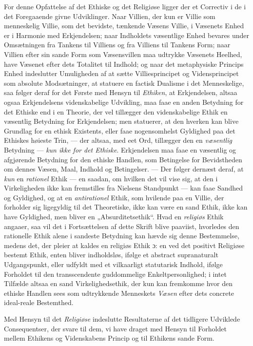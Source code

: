 \documentclass[12pt,a4paper]{book}
\newcommand{\opage}[1]{\marginnote{\footnotesize\textit{[#1]}}}
\begin{document}
\opage{163}For denne Opfattelse af det Ethiske og det Religiøse ligger der et Correctiv i de i det
Foregaaende givne Udviklinger. Naar Villien, der kun er Villie som menneskelig Villie, som
det bevidste, tænkende Væsens Villie, i Væsenets Enhed er i Harmonie med Erkjendelsen; naar
Indholdets væsentlige Enhed bevares under Omsætningen fra Tankens til Villiens og fra
Villiens til Tankens Form; naar Villien efter sin sande Form som Væsensvillen maa udtrykke
Væsenets Heelhed, have Væsenet efter dets Totalitet til Indhold; og naar det metaphysiske
Princips Enhed indeslutter Umuligheden af at sætte Villiesprincipet og Vidensprincipet som
absolute Modsætninger, at statuere en factisk Dualisme i det Menneskelige, saa følger deraf
for det Første med Hensyn til \emph{Ethiken}, at Erkjendelsen, altsaa ogsaa Erkjendelsens
videnskabelige Udvikling, maa faae en anden Betydning for det Ethiske end i en Theorie, der
vel tillægger den videnskabelige Ethik en væsentlig Betydning for Erkjendelsen; men
statuerer, at den hverken kan blive Grundlag for en ethisk Existents, eller faae
nogensomhelst Gyldighed paa det Ethiskes høieste Trin, --- der altsaa, med eet Ord, tillægger
den en \emph{væsentlig} Betydning --- \emph{kun ikke for det Ethiske}. Erkjendelsen maa faae en
væsentlig og afgjørende Betydning for den ethiske Handlen, som Betingelse for Bevidstheden
om dennes Væsen, Maal, Indhold og Betingelser. --- Der følger dernæst deraf, at \emph{kun} en \emph{rationel} Ethik --- en saadan, om hvilken det vil vise sig, at den i Virkeligheden
ikke kan fremstilles fra Nielsens Standpunkt --- kan faae Sandhed og Gyldighed, og at en
\emph{antirationel} Ethik, som hvilende paa en Villie, der forholder sig ligegyldig til det
Theoretiske, ikke kan være en sand Ethik, ikke kan have Gyldighed, men bliver en
„Absurditetsethik“. Hvad en \emph{religiøs} Ethik angaaer, saa vil det i Fortsættelsen af dette
Skrift blive paaviist, hvorledes den rationelle Ethik alene i sandeste Betydning kan hævde
sig denne Bestemmelse, medens det, der pleier at kaldes en religiøs Ethik ɔ: en ved det
positivt Religiøse bestemt Ethik, enten bliver indholdsløs, ifølge et abstract supranaturalt
Udgangspunkt, eller udfyldt \opage{164}med et vilkaarligt statutarisk Indhold, ifølge Forholdet til den
transscendente guddommelige Enkeltpersonlighed; i intet Tilfælde altsaa en sand
Virkelighedsethik, der kun kan fremkomme hvor den ethiske Handlen sees som udtrykkende Menneskets \emph{Væsen} efter dets concrete ideal-reale Bestemthed.

Med Hensyn til det \emph{Religiøse} indeslutte Resultaterne af det tidligere Udviklede
Consequentser, der svare til dem, vi have draget med Hensyn til Forholdet mellem Ethikens og
Videnskabens Princip og til Ethikens sande Form.
\end{document}
